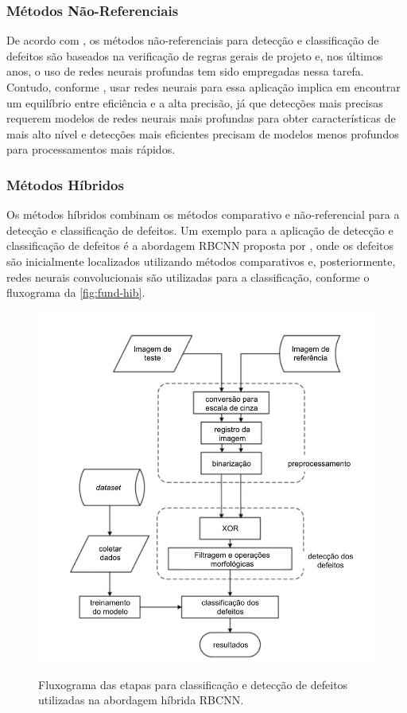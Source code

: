 \subsubsection{Métodos Não-Referenciais} \label{cap:fund-pcb-metodos-nref}
De acordo com , os métodos não-referenciais para detecção e classificação de defeitos são baseados na verificação de regras gerais de projeto e, nos últimos anos, o uso de redes neurais profundas tem sido empregadas nessa tarefa. Contudo, conforme , usar redes neurais para essa aplicação implica em encontrar um equilíbrio entre eficiência e a alta precisão, já que detecções mais precisas requerem modelos de redes neurais mais profundas para obter características de mais alto nível e detecções mais eficientes precisam de modelos menos profundos para processamentos mais rápidos.

\subsubsection{Métodos Híbridos} \label{cap:fund-pcb-metodos-hib}
Os métodos híbridos combinam os métodos comparativo e não-referencial para a detecção e classificação de defeitos. Um exemplo para a aplicação de detecção e classificação de defeitos é a abordagem RBCNN proposta por , onde os defeitos são inicialmente localizados utilizando métodos comparativos e, posteriormente, redes neurais convolucionais são utilizadas para a classificação, conforme o fluxograma da \autoref{fig:fund-hib}.

\begin{figure}[h!] %
  \centering
  \caption{Fluxograma das etapas para classificação e detecção de defeitos utilizadas na abordagem híbrida RBCNN.}
  \includegraphics[scale=0.85]{img/img-fundamentacao-hib.pdf}
  \label{fig:fund-hib}
\end{figure}

